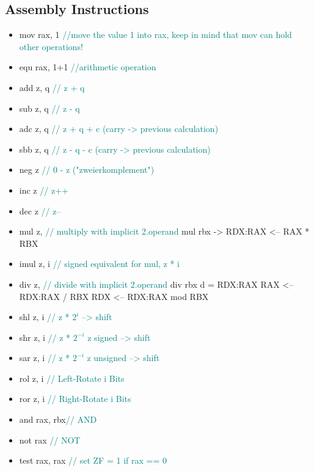 \documentclass[main.tex,fontsize=8pt,paper=a4,paper=landscape,DIV=calc,]{scrartcl}
\begin{document}
\begin{multicols*}{4}
\subsection{Assembly Instructions}
\begin{itemize}
\item mov rax, 1 \textcolor{teal}{//move the value 1 into rax, keep in mind that mov can hold other operations!}
\item equ rax, 1+1 \textcolor{teal}{//arithmetic operation}
\item add z,   q  \textcolor{teal}{// z + q} 
\item sub z,   q  \textcolor{teal}{// z - q}
\item adc z,   q  \textcolor{teal}{// z + q + c (carry -> previous calculation)}
\item sbb z,   q  \textcolor{teal}{// z - q - c (carry -> previous calculation)}
\item neg z       \textcolor{teal}{// 0 - z ("zweierkomplement")}
\item inc z       \textcolor{teal}{// z++ }
\item dec z       \textcolor{teal}{// z-- }
\item mul z,      \textcolor{teal}{// multiply with implicit 2.operand }\newline
mul rbx -> RDX:RAX <-- RAX * RBX
\item imul z,   i  \textcolor{teal}{// signed equivalent for mul, z * i }
\item div z,      \textcolor{teal}{// divide with implicit 2.operand}\newline
div rbx  \newline
d = RDX:RAX\newline
RAX <-- RDX:RAX / RBX\newline
RDX <-- RDX:RAX mod RBX
\item shl z,   i  \textcolor{teal}{// z * \(2^i\)               --> shift}
\item shr z,   i  \textcolor{teal}{// z * \(2^{-i}\) z signed   --> shift}
\item sar z,   i  \textcolor{teal}{// z * \(2^{-i}\) z unsigned --> shift}
\item rol z,   i  \textcolor{teal}{// Left-Rotate i Bits }
\item ror z,   i  \textcolor{teal}{// Right-Rotate i Bits }
\item and rax, rbx\textcolor{teal}{// AND}
\item not rax     \textcolor{teal}{// NOT}
\item test rax, rax \textcolor{teal}{// set ZF = 1 if rax == 0}

\end{itemize}
\end{multicols*}
\end{document}
